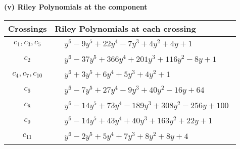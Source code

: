 \documentclass[1p]{elsarticle_modified}
\theoremstyle{definition}
\begin{document}
\flushleft \textbf{(v) Riley Polynomials at the component}\newline \\
\begin{tabular}{m{50pt}|m{274pt}}
Crossings & \hspace{64pt}Riley Polynomials at each crossing \\
\hline $$\begin{aligned}c_{1},c_{3},c_{5}\end{aligned}$$&$\begin{aligned}
&y^6-9 y^5+22 y^4-7 y^3+4 y^2+4 y+1
\end{aligned}$\\
\hline $$\begin{aligned}c_{2}\end{aligned}$$&$\begin{aligned}
&y^6-37 y^5+366 y^4+201 y^3+116 y^2-8 y+1
\end{aligned}$\\
\hline $$\begin{aligned}c_{4},c_{7},c_{10}\end{aligned}$$&$\begin{aligned}
&y^6+3 y^5+6 y^4+5 y^3+4 y^2+1
\end{aligned}$\\
\hline $$\begin{aligned}c_{6}\end{aligned}$$&$\begin{aligned}
&y^6-7 y^5+27 y^4-9 y^3+40 y^2-16 y+64
\end{aligned}$\\
\hline $$\begin{aligned}c_{8}\end{aligned}$$&$\begin{aligned}
&y^6-14 y^5+73 y^4-189 y^3+308 y^2-256 y+100
\end{aligned}$\\
\hline $$\begin{aligned}c_{9}\end{aligned}$$&$\begin{aligned}
&y^6-14 y^5+43 y^4+40 y^3+163 y^2+22 y+1
\end{aligned}$\\
\hline $$\begin{aligned}c_{11}\end{aligned}$$&$\begin{aligned}
&y^6-2 y^5+5 y^4+7 y^3+8 y^2+8 y+4
\end{aligned}$\\
\hline
\end{tabular}\\~\\
\end{document}
